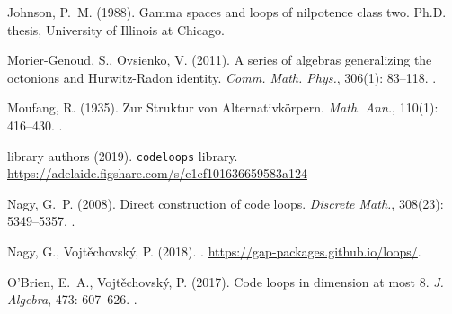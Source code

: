 \documentclass{article}
\theoremstyle{plain}
\theoremstyle{definition}
\begin{document}
\begin{thebibliography}{10}
Johnson, P.~M. (1988).
\newblock Gamma spaces and loops of nilpotence class two.
\newblock Ph.D. thesis, University of Illinois at Chicago.


Morier-Genoud, S., Ovsienko, V. (2011).
\newblock A series of algebras generalizing the octonions and {H}urwitz-{R}adon
  identity.
\newblock \emph{Comm. Math. Phys.}, 306(1): 83--118.
\newblock {}.

Moufang, R. (1935).
\newblock Zur {S}truktur von {A}lternativk\"{o}rpern.
\newblock \emph{Math. Ann.}, 110(1): 416--430.
\newblock {}.

{library authors} (2019).
\newblock \texttt{codeloops} library.
\newblock \url{https://adelaide.figshare.com/s/e1cf101636659583a124} 

Nagy, G.~P. (2008).
\newblock Direct construction of code loops.
\newblock \emph{Discrete Math.}, 308(23): 5349--5357.
\newblock {}.

Nagy, G., Vojt\v{e}chovsk\'{y}, P. (2018).
.
\newblock \url{https://gap-packages.github.io/loops/}.

O'Brien, E.~A., Vojt\v{e}chovsk\'{y}, P. (2017).
\newblock Code loops in dimension at most 8.
\newblock \emph{J. Algebra}, 473: 607--626.
\newblock {}.



\end{thebibliography}



\vfill\eject
\end{document}

